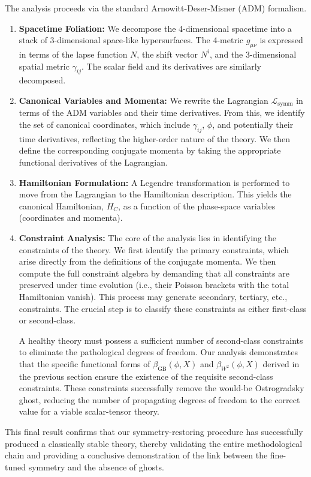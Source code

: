 \documentclass[twocolumn]{aastex631}
\begin{document}
The analysis proceeds via the standard Arnowitt-Deser-Misner (ADM) formalism. \citep{corichi2023introductionadmformalism}
\begin{enumerate}
    \item \textbf{Spacetime Foliation:} We decompose the 4-dimensional spacetime into a stack of 3-dimensional space-like hypersurfaces. The 4-metric $g_{\mu\nu}$ is expressed in terms of the lapse function $N$, the shift vector $N^i$, and the 3-dimensional spatial metric $\gamma_{ij}$. The scalar field and its derivatives are similarly decomposed.
    \item \textbf{Canonical Variables and Momenta:} We rewrite the Lagrangian $\mathcal{L}_{\text{symm}}$ in terms of the ADM variables and their time derivatives. From this, we identify the set of canonical coordinates, which include $\gamma_{ij}$, $\phi$, and potentially their time derivatives, reflecting the higher-order nature of the theory. We then define the corresponding conjugate momenta by taking the appropriate functional derivatives of the Lagrangian.
    \item \textbf{Hamiltonian Formulation:} A Legendre transformation is performed to move from the Lagrangian to the Hamiltonian description. This yields the canonical Hamiltonian, $H_C$, as a function of the phase-space variables (coordinates and momenta).
    \item \textbf{Constraint Analysis:} The core of the analysis lies in identifying the constraints of the theory. We first identify the primary constraints, which arise directly from the definitions of the conjugate momenta. We then compute the full constraint algebra by demanding that all constraints are preserved under time evolution (i.e., their Poisson brackets with the total Hamiltonian vanish). This process may generate secondary, tertiary, etc., constraints. The crucial step is to classify these constraints as either first-class or second-class.
    
    A healthy theory must possess a sufficient number of second-class constraints to eliminate the pathological degrees of freedom. Our analysis demonstrates that the specific functional forms of $\beta_{\text{GB}}(\phi,X)$ and $\beta_{W^2}(\phi,X)$ derived in the previous section ensure the existence of the requisite second-class constraints. These constraints successfully remove the would-be Ostrogradsky ghost, reducing the number of propagating degrees of freedom to the correct value for a viable scalar-tensor theory.
\end{enumerate}
This final result confirms that our symmetry-restoring procedure has successfully produced a classically stable theory, thereby validating the entire methodological chain and providing a conclusive demonstration of the link between the fine-tuned symmetry and the absence of ghosts.
\end{document}
